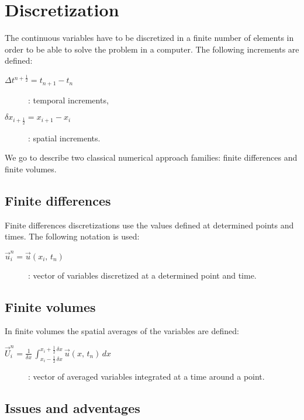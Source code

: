 \chapter{Discretization}

The continuous variables have to be discretized in a finite number of elements
in order to be able to solve the problem in a computer. The following increments
are defined:
\begin{description}
	\item[$\Delta t^{n+\frac12}=t_{n+1}-t_n$]: temporal increments,
	\item[$\delta x_{i+\frac12}=x_{i+1}-x_i$]: spatial increments.
\end{description}

We go to describe two classical numerical approach families: finite differences
and finite volumes.

\section{Finite differences}

Finite differences discretizations use the values defined at determined points
and times. The following notation is used:
\begin{description}
	\item[$\vec{u}_i^n=\vec{u}\left(x_i,\,t_n\right)$]: vector of variables
		discretized at a determined point and time.
\end{description}

\section{Finite volumes}

In finite volumes the spatial averages of the variables are defined:
\begin{description}
	\item[$\displaystyle\vec{U}_i^n=\frac1{\delta x}\,
		\int_{x_i-\frac12\,\delta x}^{x_i+\frac12\,\delta x}
		\vec{u}\left(x,\,t_n\right)\,dx$]:
		vector of averaged variables integrated at a time around a point.
\end{description}

\section{Issues and adventages}



